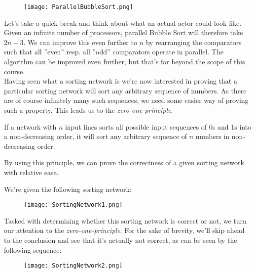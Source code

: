 \documentclass[main]{subfiles}
\begin{document}
\begin{figure}[H]
    \centering
    \texttt{[image: ParallelBubbleSort.png]}
\end{figure}Let’s take a quick break and think about what an actual actor could look like.
Given an infinite number of processors, parallel Bubble Sort will therefore take $2n-3$. We can improve this even further to $n$ by rearranging the comparators such that all ''even'' resp. all ''odd'' comparators operate in parallel. The algorithm can be improved even further, but that's far beyond the scope of this course.\\[3mm]
Having seen what a sorting network is we're now interested in proving that a particular sorting network will sort any arbitrary sequence of numbers. As there are of course infinitely many such sequences, we need some easier way of proving such a property. This leads us to the \textit{zero-one principle}.
\begin{theorem}
    If a network with $n$ input lines sorts all possible input sequences of 0s and 1s into a non-decreasing order, it will sort any arbitrary sequence of $n$ numbers in non-decreasing order.
\end{theorem}
By using this principle, we can prove the correctness of a given sorting network with relative ease.
\newpage
\begin{example}
    We're given the following sorting network:
\begin{figure}[H]
    \centering
    \texttt{[image: SortingNetwork1.png]}
\end{figure}
\noindent Tasked with determining whether this sorting network is correct or not, we turn our attention to the \textit{zero-one-principle}. 
For the sake of brevity, we'll skip ahead to the conclusion and see that it's actually not correct, as can be seen by the following sequence:
\begin{figure}[H]
    \centering
    \texttt{[image: SortingNetwork2.png]}
\end{figure}
\end{example}

\newpage
\end{document}
